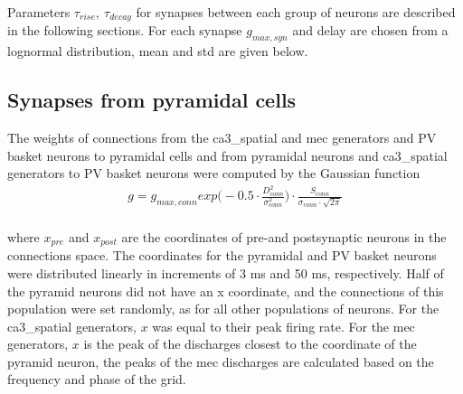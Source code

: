 \documentclass[a4paper,12pt]{article}
\begin{document}

Parameters $\tau_{rise},\ \tau_{decay}$ for synapses between each group of neurons are described in the following sections. For each synapse $g_{max, syn}$ and delay are chosen from a lognormal distribution, mean and std are given below.  

\subsection{Synapses from pyramidal cells}










% 


The weights of connections from the ca3\_spatial and mec generators and PV basket neurons to pyramidal cells and from pyramidal neurons and ca3\_spatial generators to PV basket neurons were computed by the Gaussian function
\begin{equation}
\begin{aligned}
\label{eq:gaussian}
g = g_{max, conn} exp \Big( -0.5 \cdot \frac{D_{conn}^2}{\sigma_{conn}^2} \Big) \cdot \frac{S_{conn}}{\sigma_{conn} \cdot \sqrt{2 \pi}} \\
\end{aligned}
\end{equation}

where $x_{pre}$ and $x_{post}$ are the coordinates of pre-and postsynaptic neurons in the connections space. The coordinates for the pyramidal and PV basket neurons were distributed linearly in increments of 3 ms and 50 ms, respectively. Half of the pyramid neurons did not have an x coordinate, and the connections of this population were set randomly, as for all other populations of neurons. For the ca3\_spatial generators, $x$ was equal to their peak firing rate.  For the mec generators,  $x$ is the peak of the discharges closest to the coordinate of the pyramid neuron, the peaks of the mec discharges are calculated based on the frequency and phase of the grid.
\end{document}
